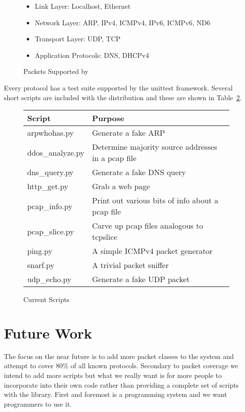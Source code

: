 \documentclass[11pt]{article}
\begin{document}
\begin{figure}
  \centering
  \begin{itemize}
  \item Link Layer: Localhost, Ethernet
  \item Network Layer: ARP, IPv4, ICMPv4, IPv6, ICMPv6, ND6
  \item Transport Layer: UDP, TCP
  \item Application Protocols: DNS, DHCPv4
  \end{itemize}
  \caption{Packets Supported by }
  \label{fig:packets-supported-by-pcs}
\end{figure}

Every protocol has a test suite supported by the 
unittest framework.  Several short scripts are included with the
distribution and these are shown in
Table~\ref{fig:current-pcs-scripts}.

\begin{figure}
  \centering
\begin{tabular}{|l|l|}
\hline
Script & Purpose \\
\hline
arpwhohas.py & Generate a fake ARP\\
ddos\_analyze.py & Determine majority source addresses in a pcap file \\
dns\_query.py & Generate a fake DNS query\\
http\_get.py & Grab a web page\\
pcap\_info.py & Print out various bits of info about a pcap file \\
pcap\_slice.py & Carve up pcap files analogous to tcpslice\\
ping.py & A simple ICMPv4 packet generator \\
snarf.py & A trivial packet sniffer \\
udp\_echo.py & Generate a fake UDP packet\\
\hline
\end{tabular}
  \caption{Current  Scripts}
  \label{fig:current-pcs-scripts}
\end{figure}

\section{Future Work}
\label{sec:future-work}

The focus on the near future is to add more packet classes to the
system and attempt to cover $80\%$ of all known protocols.  Secondary
to packet coverage we intend to add more scripts but what we really
want is for more people to incorporate  into their own
code rather than providing a complete set of scripts with the
library.  First and foremost  is a programming system and
we want programmers to use it.
\end{document}
